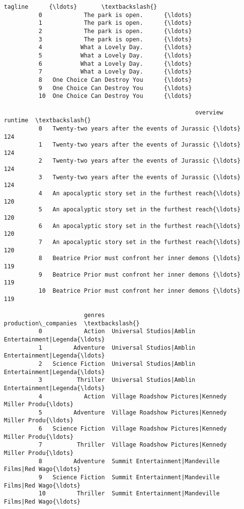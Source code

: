 \documentclass[11pt]{article}
\begin{document}
\begin{Verbatim}[commandchars=\\\{\}]
                                 tagline      {\ldots}       \textbackslash{}
          0            The park is open.      {\ldots}        
          1            The park is open.      {\ldots}        
          2            The park is open.      {\ldots}        
          3            The park is open.      {\ldots}        
          4           What a Lovely Day.      {\ldots}        
          5           What a Lovely Day.      {\ldots}        
          6           What a Lovely Day.      {\ldots}        
          7           What a Lovely Day.      {\ldots}        
          8   One Choice Can Destroy You      {\ldots}        
          9   One Choice Can Destroy You      {\ldots}        
          10  One Choice Can Destroy You      {\ldots}        
          
                                                       overview runtime  \textbackslash{}
          0   Twenty-two years after the events of Jurassic {\ldots}     124   
          1   Twenty-two years after the events of Jurassic {\ldots}     124   
          2   Twenty-two years after the events of Jurassic {\ldots}     124   
          3   Twenty-two years after the events of Jurassic {\ldots}     124   
          4   An apocalyptic story set in the furthest reach{\ldots}     120   
          5   An apocalyptic story set in the furthest reach{\ldots}     120   
          6   An apocalyptic story set in the furthest reach{\ldots}     120   
          7   An apocalyptic story set in the furthest reach{\ldots}     120   
          8   Beatrice Prior must confront her inner demons {\ldots}     119   
          9   Beatrice Prior must confront her inner demons {\ldots}     119   
          10  Beatrice Prior must confront her inner demons {\ldots}     119   
          
                       genres                               production\_companies  \textbackslash{}
          0            Action  Universal Studios|Amblin Entertainment|Legenda{\ldots}   
          1         Adventure  Universal Studios|Amblin Entertainment|Legenda{\ldots}   
          2   Science Fiction  Universal Studios|Amblin Entertainment|Legenda{\ldots}   
          3          Thriller  Universal Studios|Amblin Entertainment|Legenda{\ldots}   
          4            Action  Village Roadshow Pictures|Kennedy Miller Produ{\ldots}   
          5         Adventure  Village Roadshow Pictures|Kennedy Miller Produ{\ldots}   
          6   Science Fiction  Village Roadshow Pictures|Kennedy Miller Produ{\ldots}   
          7          Thriller  Village Roadshow Pictures|Kennedy Miller Produ{\ldots}   
          8         Adventure  Summit Entertainment|Mandeville Films|Red Wago{\ldots}   
          9   Science Fiction  Summit Entertainment|Mandeville Films|Red Wago{\ldots}   
          10         Thriller  Summit Entertainment|Mandeville Films|Red Wago{\ldots}   
          

\end{Verbatim}
\end{document}
